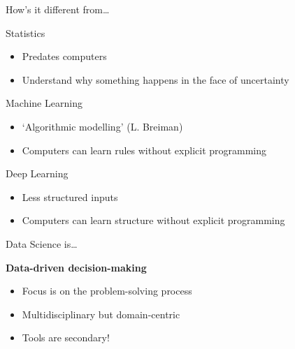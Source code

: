 \begin{frame}{How's it different from\ldots}
    \begin{block}{Statistics}\vspace{-0.25em}
        \begin{itemize}
            \item Predates computers
            \item \alert{Understand why something happens} in the face of
                  uncertainty
        \end{itemize}
    \end{block}
    \vfill\pause
    \begin{block}{Machine Learning}\vspace{-0.25em}
        \begin{itemize}
            \item `Algorithmic modelling' (L. Breiman)
            \item Computers can \alert{learn rules} without explicit programming
        \end{itemize}
    \end{block}
    \vfill\pause
    \begin{block}{Deep Learning}\vspace{-0.25em}
        \begin{itemize}
            \item Less structured inputs
            \item Computers can \alert{learn structure} without explicit
                  programming
        \end{itemize}
    \end{block}
\end{frame}

\begin{frame}{Data Science is\ldots}
    \begin{center}
        \LARGE\bf%
        Data\hyp{}driven decision\hyp{}making
    \end{center}
    \vfill
    \begin{itemize}
        \item Focus is on the problem\hyp{}solving process
        \item Multidisciplinary but domain\hyp{}centric
        \item Tools are secondary!
    \end{itemize}
\end{frame}

